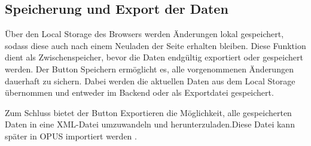 \subsection{Speicherung und Export der Daten}
Über den Local Storage des Browsers werden Änderungen lokal gespeichert,
sodass diese auch nach einem Neuladen der Seite erhalten bleiben.
Diese Funktion dient als Zwischenspeicher, bevor die Daten endgültig exportiert oder gespeichert werden.
Der Button \glqq Speichern\grqq{} ermöglicht es, alle vorgenommenen Änderungen dauerhaft zu sichern.
Dabei werden die aktuellen Daten aus dem Local Storage übernommen und entweder im Backend oder als Exportdatei gespeichert.

Zum Schluss  bietet der Button \glqq Exportieren\grqq{} die Möglichkeit,
alle gespeicherten Daten in eine XML-Datei umzuwandeln und herunterzuladen.Diese Datei kann später in OPUS importiert werden .
